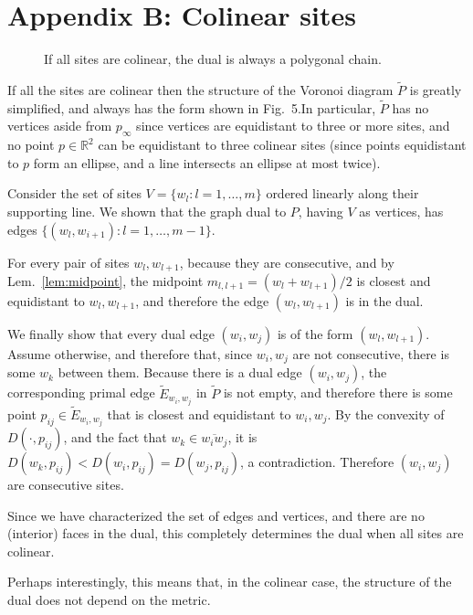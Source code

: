 \documentclass[11pt]{article}
\begin{document}
\section*{Appendix B: Colinear sites}\label{app:colinear}


\begin{figure}[ht]
\centering
{}
\caption{If all sites are colinear, the dual is always a polygonal chain.}
\end{figure}


If all the sites are colinear then the structure of the Voronoi diagram
$\tilde{P}$ is
greatly simplified, and always has the form shown in
Fig.\  5.In particular, $\tilde{P}$ has no vertices aside from $p_\infty$ since 
vertices are equidistant to three or more sites, 
and no point $p\in\mathbb{R}^2$ can be equidistant to three colinear
sites (since points equidistant to $p$ form an ellipse, and a line
intersects an ellipse at most twice). 

Consider the set of sites $V=\{w_l : l=1,\dots,m\}$ ordered linearly along
their supporting line. 
We shown that the graph dual to $P$, having $V$ as vertices,
has edges $\{(w_l,w_{i+1}) : l=1,\dots,m-1\}$. 

For every pair of sites $w_l,w_{l+1}$, because they are consecutive, and by Lem.~\ref{lem:midpoint}, 
the midpoint $m_{l,l+1} = (w_l+w_{l+1})/2$ is closest and equidistant to $w_l,w_{l+1}$,
and therefore the edge $(w_l,w_{l+1})$ is in the dual. 

We finally show that every dual edge $(w_i,w_j)$ is of the form
$(w_l,w_{l+1})$. Assume otherwise, and therefore that, since $w_i,w_j$ are
not consecutive, there is some $w_k$ between them. 
Because there is a dual edge $(w_i,w_j)$, the
corresponding primal edge $\tilde{E}_{w_i,w_j}$ in $\tilde{P}$ is not empty, and therefore there is some 
point $p_{ij}\in \tilde{E}_{w_i,w_j}$ that is closest and equidistant to $w_i,w_j$. 
By the convexity of $D(\cdot,p_{ij})$, and the fact that $w_k\in \overline{w_i
w_j}$, it is $D(w_k,p_{ij}) < D(w_i,p_{ij}) = D(w_j,p_{ij})$, a
contradiction. Therefore $(w_i,w_j)$ are consecutive sites. 

Since we have characterized the set of edges and vertices, and
there are no (interior) faces in the dual, this completely determines the
dual when all sites are colinear. 

Perhaps interestingly, this means that, in the colinear case, the structure of the dual does not depend on the metric.
\end{document}
